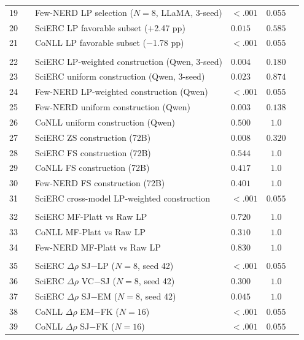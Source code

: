 \begin{table}[t]
\begin{tabular}{clllcc}
19 & & Few-NERD LP selection ($N{=}8$, LLaMA, 3-seed) & ${<}.001$ & $0.055$ & \\
20 & & SciERC LP favorable subset ($+$2.47 pp) & $0.015$ & $0.585$ &  \\
21 & & CoNLL LP favorable subset ($-$1.78 pp) & ${<}.001$ & $0.055$ & \\
\addlinespace
\multicolumn{6}{l}{\textit{Construction}} \\
22 & & SciERC LP-weighted construction (Qwen, 3-seed) & $0.004$ & $0.180$ &  \\
23 & & SciERC uniform construction (Qwen, 3-seed) & $0.023$ & $0.874$ &  \\
24 & & Few-NERD LP-weighted construction (Qwen) & ${<}.001$ & $0.055$ & \\
25 & & Few-NERD uniform construction (Qwen) & $0.003$ & $0.138$ &  \\
26 & & CoNLL uniform construction (Qwen) & $0.500$ & $1.0$ &  \\
27 & & SciERC ZS construction (72B) & $0.008$ & $0.320$ &  \\
28 & & SciERC FS construction (72B) & $0.544$ & $1.0$ &  \\
29 & & CoNLL FS construction (72B) & $0.417$ & $1.0$ &  \\
30 & & Few-NERD FS construction (72B) & $0.401$ & $1.0$ &  \\
31 & & SciERC cross-model LP-weighted construction & ${<}.001$ & $0.055$ & \\
\addlinespace
\multicolumn{6}{l}{\textit{Calibration}} \\
32 & & SciERC MF-Platt vs Raw LP & $0.720$ & $1.0$ &  \\
33 & & CoNLL MF-Platt vs Raw LP & $0.310$ & $1.0$ &  \\
34 & & Few-NERD MF-Platt vs Raw LP & $0.830$ & $1.0$ &  \\
\addlinespace
\multicolumn{6}{l}{\textit{Signal $\Delta\rho$}} \\
35 & & SciERC $\Delta\rho$ SJ$-$LP ($N{=}8$, seed 42) & ${<}.001$ & $0.055$ & \\
36 & & SciERC $\Delta\rho$ VC$-$SJ ($N{=}8$, seed 42) & $0.300$ & $1.0$ &  \\
37 & & SciERC $\Delta\rho$ SJ$-$EM ($N{=}8$, seed 42) & $0.045$ & $1.0$ &  \\
38 & & CoNLL $\Delta\rho$ EM$-$FK ($N{=}16$) & ${<}.001$ & $0.055$ & \\
39 & & CoNLL $\Delta\rho$ SJ$-$FK ($N{=}16$) & ${<}.001$ & $0.055$ & \\

\end{tabular}
\end{table}
